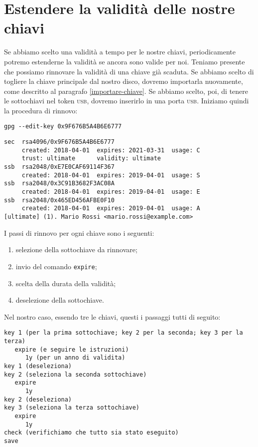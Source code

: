 \section{Estendere la validità delle nostre chiavi}

Se abbiamo scelto una validità a tempo per le nostre chiavi, periodicamente
potremo estenderne la validità se ancora sono valide per noi. Teniamo presente
che possiamo rinnovare la validità di una chiave già scaduta. Se abbiamo scelto
di togliere la chiave principale dal nostro disco, dovremo importarla
nuovamente, come descritto al paragrafo \vref{importare-chiave}. Se abbiamo
scelto, poi, di tenere le sottochiavi nel token \textsc{usb}, dovremo inserirlo
in una porta \textsc{usb}. Iniziamo quindi la procedura di rinnovo:

\begin{lstlisting}
gpg --edit-key 0x9F676B5A4B6E6777
\end{lstlisting}

\begin{lstlisting}
sec  rsa4096/0x9F676B5A4B6E6777
     created: 2018-04-01  expires: 2021-03-31  usage: C
     trust: ultimate      validity: ultimate
ssb  rsa2048/0xE7E0CAF69114F367
     created: 2018-04-01  expires: 2019-04-01  usage: S
ssb  rsa2048/0x3C91B3682F3AC08A
     created: 2018-04-01  expires: 2019-04-01  usage: E
ssb  rsa2048/0x465ED456AFBE0F10
     created: 2018-04-01  expires: 2019-04-01  usage: A
[ultimate] (1). Mario Rossi <mario.rossi@example.com>
\end{lstlisting}

I passi di rinnovo per ogni chiave sono i seguenti:

\begin{enumerate}
    \item selezione della sottochiave da rinnovare;
    \item invio del comando \texttt{expire};
    \item scelta della durata della validità;
    \item deselezione della sottochiave.
\end{enumerate}

Nel nostro caso, essendo tre le chiavi, questi i passaggi tutti di seguito:

\begin{lstlisting}
key 1 (per la prima sottochiave; key 2 per la seconda; key 3 per la terza)
   expire (e seguire le istruzioni)
      1y (per un anno di validita)
key 1 (deseleziona)
key 2 (seleziona la seconda sottochiave)
   expire
      1y
key 2 (deseleziona)
key 3 (seleziona la terza sottochiave)
   expire
      1y
check (verifichiamo che tutto sia stato eseguito)
save
\end{lstlisting}
